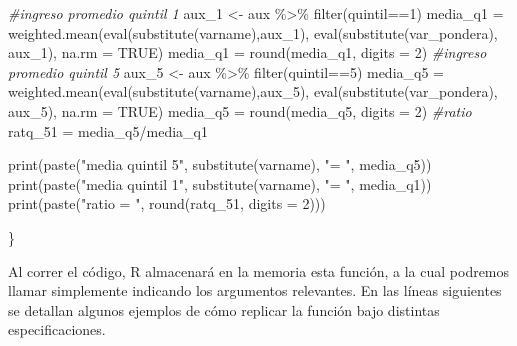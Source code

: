 \documentclass[
]{book}
\newenvironment{Shaded}{\begin{snugshade}}{\end{snugshade}}
\newcommand{\AttributeTok}[1]{\textcolor[rgb]{0.77,0.63,0.00}{#1}}
\newcommand{\CommentTok}[1]{\textcolor[rgb]{0.56,0.35,0.01}{\textit{#1}}}
\newcommand{\ConstantTok}[1]{\textcolor[rgb]{0.00,0.00,0.00}{#1}}
\newcommand{\DecValTok}[1]{\textcolor[rgb]{0.00,0.00,0.81}{#1}}
\newcommand{\FunctionTok}[1]{\textcolor[rgb]{0.00,0.00,0.00}{#1}}
\newcommand{\NormalTok}[1]{#1}
\newcommand{\OtherTok}[1]{\textcolor[rgb]{0.56,0.35,0.01}{#1}}
\newcommand{\SpecialCharTok}[1]{\textcolor[rgb]{0.00,0.00,0.00}{#1}}
\newcommand{\StringTok}[1]{\textcolor[rgb]{0.31,0.60,0.02}{#1}}
\begin{document}
\begin{Shaded}
\begin{Highlighting}[numbers=left,,]
    
    \CommentTok{\#ingreso promedio quintil 1 }
\NormalTok{    aux\_1 }\OtherTok{\textless{}{-}}\NormalTok{ aux }\SpecialCharTok{\%\textgreater{}\%} \FunctionTok{filter}\NormalTok{(quintil}\SpecialCharTok{==}\DecValTok{1}\NormalTok{) }
\NormalTok{    media\_q1 }\OtherTok{=} \FunctionTok{weighted.mean}\NormalTok{(}\FunctionTok{eval}\NormalTok{(}\FunctionTok{substitute}\NormalTok{(varname),aux\_1), }\FunctionTok{eval}\NormalTok{(}\FunctionTok{substitute}\NormalTok{(var\_pondera), aux\_1), }\AttributeTok{na.rm =} \ConstantTok{TRUE}\NormalTok{)}
\NormalTok{    media\_q1 }\OtherTok{=} \FunctionTok{round}\NormalTok{(media\_q1, }\AttributeTok{digits =} \DecValTok{2}\NormalTok{)}
    \CommentTok{\#ingreso promedio quintil 5 }
\NormalTok{    aux\_5 }\OtherTok{\textless{}{-}}\NormalTok{ aux }\SpecialCharTok{\%\textgreater{}\%} \FunctionTok{filter}\NormalTok{(quintil}\SpecialCharTok{==}\DecValTok{5}\NormalTok{) }
\NormalTok{    media\_q5 }\OtherTok{=} \FunctionTok{weighted.mean}\NormalTok{(}\FunctionTok{eval}\NormalTok{(}\FunctionTok{substitute}\NormalTok{(varname),aux\_5), }\FunctionTok{eval}\NormalTok{(}\FunctionTok{substitute}\NormalTok{(var\_pondera), aux\_5), }\AttributeTok{na.rm =} \ConstantTok{TRUE}\NormalTok{)}
\NormalTok{    media\_q5 }\OtherTok{=} \FunctionTok{round}\NormalTok{(media\_q5, }\AttributeTok{digits =} \DecValTok{2}\NormalTok{)}
    \CommentTok{\#ratio}
\NormalTok{    ratq\_51 }\OtherTok{=}\NormalTok{ media\_q5}\SpecialCharTok{/}\NormalTok{media\_q1}
    
    
    \FunctionTok{print}\NormalTok{(}\FunctionTok{paste}\NormalTok{(}\StringTok{"media quintil 5"}\NormalTok{, }\FunctionTok{substitute}\NormalTok{(varname), }\StringTok{"= "}\NormalTok{, media\_q5))}
    \FunctionTok{print}\NormalTok{(}\FunctionTok{paste}\NormalTok{(}\StringTok{"media quintil 1"}\NormalTok{, }\FunctionTok{substitute}\NormalTok{(varname), }\StringTok{"= "}\NormalTok{, media\_q1))}
    \FunctionTok{print}\NormalTok{(}\FunctionTok{paste}\NormalTok{(}\StringTok{"ratio = "}\NormalTok{, }\FunctionTok{round}\NormalTok{(ratq\_51, }\AttributeTok{digits =} \DecValTok{2}\NormalTok{)))}
    
  
\NormalTok{\}}
\end{Highlighting}
\end{Shaded}

Al correr el código, R almacenará en la memoria esta función, a la cual podremos llamar simplemente indicando los argumentos relevantes. En las líneas siguientes se detallan algunos ejemplos de cómo replicar la función bajo distintas especificaciones.
\end{document}
